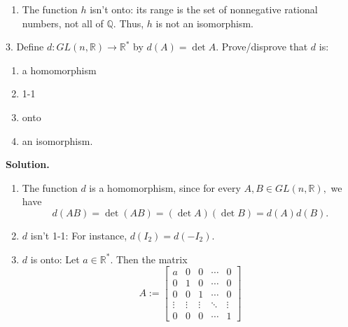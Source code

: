 \documentclass[10pt,]{book}
\theoremstyle{plain}
\theoremstyle{definition}
\theoremstyle{definition}
\theoremstyle{definition}
\theoremstyle{definition}
\numberwithin{equation}{section}
\def\R{\mathbb{R}}
\def\Q{\mathbb{Q}}
\newcommand{\amp}{ & }
\begin{document}
\begin{exerciselist}
\begin{enumerate}[label=(\alph*)]
\begin{enumerate}[label=\roman*.]
\item\hypertarget{li-173}{}
            The function \(h\) isn't onto: its range is the set of nonnegative rational
            numbers, not all of \(\Q\). Thus, \(h\) is not an isomorphism.
\end{enumerate}
%
\end{enumerate}
\item[3.]\hypertarget{exercise-23}{}
        Define \(d : GL(n,\R)\to \R^*\) by \(d(A)=\det A\). Prove/disprove that \(d\) is:
        \leavevmode%
\begin{enumerate}[label=(\alph*)]
\item\hypertarget{li-174}{}
              a homomorphism
\item\hypertarget{li-175}{}
              1-1
\item\hypertarget{li-176}{}
              onto
\item\hypertarget{li-177}{}
              an isomorphism.
\end{enumerate}

\par\smallskip
\par\smallskip
\noindent\textbf{Solution.}\hypertarget{solution-23}{}\quad
\leavevmode%
\begin{enumerate}[label=(\alph*)]
\item\hypertarget{li-178}{}
          The function \(d\) is a homomorphism, since for every \(A,B \in
          GL(n,\R),\) we have
\begin{equation*}

            d(AB)=\det(AB)=(\det A)(\det B)=d(A)d(B).
          
\end{equation*}

\item\hypertarget{li-179}{}
          \(d\) isn't 1-1: For instance, \(d(I_2)=d(-I_2)\).
\item\hypertarget{li-180}{}
          \(d\) is onto: Let \(a\in \R^*\). Then the matrix
\begin{equation*}

            A:=\begin{bmatrix}a \amp  0 \amp  0 \amp  \cdots \amp  0 \\
            0 \amp  1 \amp  0 \amp  \cdots \amp  0 \\
            0 \amp  0 \amp  1 \amp  \cdots \amp  0 \\
            \vdots \amp  \vdots \amp  \vdots \amp  \ddots \amp  \vdots \\
            0 \amp  0 \amp  0 \amp  \cdots \amp  1
            \end{bmatrix}
          

\end{equation*}
\end{enumerate}
\end{exerciselist}
\end{document}
